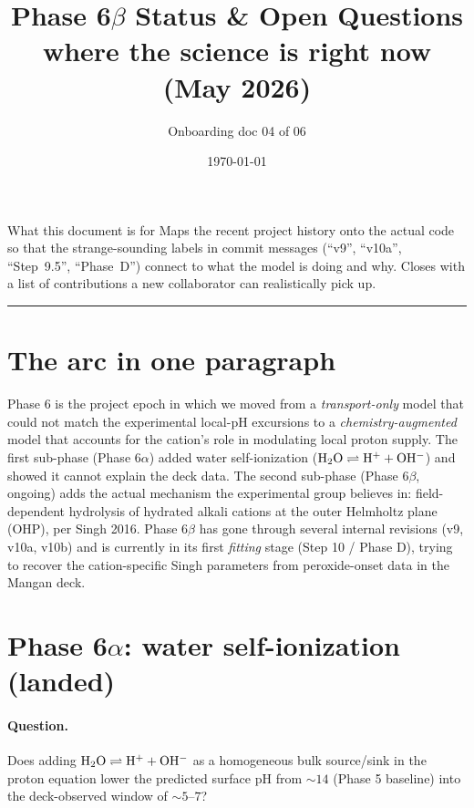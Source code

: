 \documentclass[11pt]{article}
\title{\bfseries Phase 6$\beta$ Status \& Open Questions \\
       \large where the science is right now (May 2026)}
\author{Onboarding doc 04 of 06}
\date{\today}
\begin{document}
\maketitle

\begin{callout}{What this document is for}
Maps the recent project history onto the actual code so that the
strange-sounding labels in commit messages (``v9'', ``v10a'',
``Step~9.5'', ``Phase~D'') connect to what the model is doing and
why. Closes with a list of contributions a new collaborator can
realistically pick up.
\end{callout}

\tableofcontents
\bigskip\hrule\bigskip

\section{The arc in one paragraph}

Phase 6 is the project epoch in which we moved from a
\emph{transport-only} model that could not match the experimental
local-pH excursions to a \emph{chemistry-augmented} model that
accounts for the cation's role in modulating local proton supply.
The first sub-phase (Phase 6$\alpha$) added water self-ionization
($\mathrm{H_2O} \rightleftharpoons \mathrm{H^+} + \mathrm{OH^-}$) and showed it cannot
explain the deck data. The second sub-phase (Phase 6$\beta$, ongoing)
adds the actual mechanism the experimental group believes in:
field-dependent hydrolysis of hydrated alkali cations at the outer
Helmholtz plane (OHP), per Singh 2016. Phase 6$\beta$ has gone
through several internal revisions (v9, v10a, v10b) and is currently
in its first \emph{fitting} stage (Step 10 / Phase D), trying to
recover the cation-specific Singh parameters from peroxide-onset
data in the Mangan deck.

\section{Phase 6$\alpha$: water self-ionization (landed)}

\paragraph{Question.} Does adding $\mathrm{H_2O} \rightleftharpoons \mathrm{H^+} + \mathrm{OH^-}$
as a homogeneous bulk source/sink in the proton equation lower the
predicted surface pH from $\sim 14$ (Phase 5 baseline) into the
deck-observed window of $\sim 5$--$7$?
\end{document}
